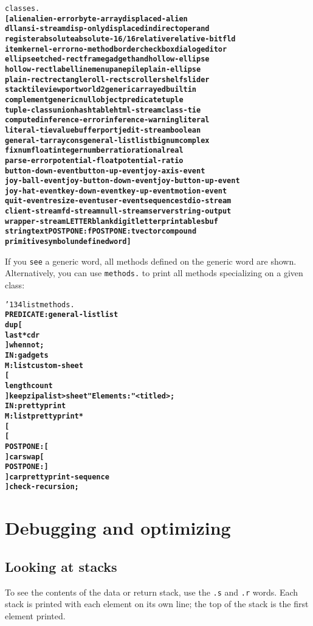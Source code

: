 \documentclass{book}
\newcommand{\bs}{\char'134}
\begin{document}
\begin{alltt}
  classes.
\textbf{[ alien alien-error byte-array displaced-alien
dll ansi-stream disp-only displaced indirect operand
register absolute absolute-16/16 relative relative-bitfld
item kernel-error no-method border checkbox dialog editor
ellipse etched-rect frame gadget hand hollow-ellipse
hollow-rect label line menu pane pile plain-ellipse
plain-rect rectangle roll-rect scroller shelf slider
stack tile viewport world 2generic arrayed builtin
complement generic null object predicate tuple
tuple-class union hashtable html-stream class-tie
computed inference-error inference-warning literal
literal-tie value buffer port jedit-stream boolean
general-t array cons general-list list bignum complex
fixnum float integer number ratio rational real
parse-error potential-float potential-ratio
button-down-event button-up-event joy-axis-event
joy-ball-event joy-button-down-event joy-button-up-event
joy-hat-event key-down-event key-up-event motion-event
quit-event resize-event user-event sequence stdio-stream
client-stream fd-stream null-stream server string-output
wrapper-stream LETTER blank digit letter printable sbuf
string text POSTPONE: f POSTPONE: t vector compound
primitive symbol undefined word ]}
\end{alltt}

If you \texttt{see} a generic word, all methods defined on the generic word are shown.
Alternatively, you can use \texttt{methods.} to print all methods specializing on a
given class:

\begin{alltt}
  \bs list methods.
\textbf{PREDICATE: general-list list
    dup [
        last* cdr
    ] when not ;
IN: gadgets
M: list custom-sheet
    [
        length count
    ] keep zip alist>sheet "Elements:" <titled> ;
IN: prettyprint
M: list prettyprint*
    [
        [
            POSTPONE: [
        ] car swap [
            POSTPONE: ]
        ] car prettyprint-sequence
    ] check-recursion ;}
\end{alltt}

\chapter{Debugging and optimizing}

\section{Looking at stacks}

To see the contents of the data or return stack, use the \texttt{.s} and \texttt{.r} words.
Each stack is printed with each element on its own line; the top of the stack is the first element printed.
\end{document}
